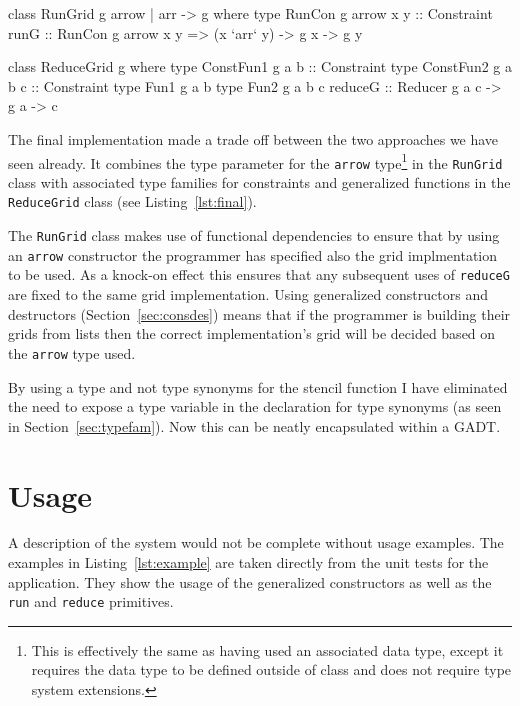 \documentclass[12pt,a4paper,oneside]{scrbook}
\begin{document}
\begin{hflisting}[label=lst:final, caption={The final signatures of the
  \texttt{RunGrid} and \texttt{ReduceGrid} classes.}]
class RunGrid g arrow | arr -> g where
    type RunCon g arrow x y :: Constraint
    runG :: RunCon g arrow x y =>
            (x `arr` y)
            -> g x -> g y

class ReduceGrid g where
    type ConstFun1 g a b :: Constraint
    type ConstFun2 g a b c :: Constraint
    type Fun1 g a b
    type Fun2 g a b c
    reduceG :: Reducer g a c -> g a -> c
\end{hflisting}

The final implementation made a trade off between the two approaches we have
seen already. It combines the type parameter for the \texttt{arrow}
type\footnote{This is effectively the same as having used an associated data
  type, except it requires the data type to be defined outside of class and
  does not require type system extensions.} in the \texttt{RunGrid} class with
associated type families for constraints and generalized functions in the
\texttt{ReduceGrid} class (see Listing~\ref{lst:final}).

The \texttt{RunGrid} class makes use of functional dependencies to ensure that
by using an \texttt{arrow} constructor the programmer has specified also the grid
implmentation to be used. As a knock-on effect this ensures that any subsequent
uses of \texttt{reduceG} are fixed to the same grid implementation. Using
generalized constructors and destructors (Section~\ref{sec:consdes}) means that
if the programmer is building their grids from lists then the correct
implementation's grid will be decided based on the \texttt{arrow} type used.

By using a type and not type synonyms for the stencil function I have eliminated
the need to expose a type variable in the declaration for type synonyms (as seen
in Section~\ref{sec:typefam}). Now this can be neatly encapsulated within a
GADT.

\section{Usage}

A description of the system would not be complete without usage examples. The
examples in Listing~\ref{lst:example} are taken directly from the unit tests for
the application. They show the usage of the generalized constructors as well as
the \texttt{run} and \texttt{reduce} primitives.
\end{document}
